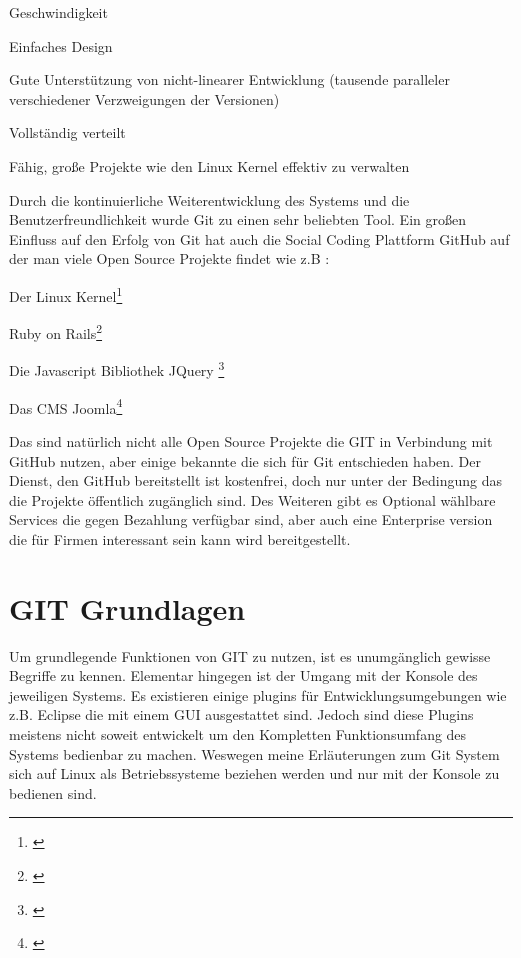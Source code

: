 \documentclass[12pt,a4paper,bibliography=totocnumbered,listof=totocnumbered]{scrartcl}
\begin{document}
\begin{compactitem}
	\item Geschwindigkeit
	\item Einfaches Design
	\item Gute Unterstützung von nicht-linearer Entwicklung (tausende paralleler verschiedener Verzweigungen der Versionen)
	\item Vollständig verteilt
	\item Fähig, große Projekte wie den Linux Kernel effektiv zu verwalten
\end{compactitem}
Durch die kontinuierliche Weiterentwicklung des Systems und die Benutzerfreundlichkeit wurde Git zu einen sehr beliebten Tool.
Ein großen Einfluss auf den Erfolg von Git hat auch die Social Coding Plattform GitHub auf der man viele Open Source Projekte findet wie z.B :

\begin{compactitem}
	\item Der Linux Kernel\footnote{\cite{linux}}
	\item Ruby on Rails\footnote{\cite{ruby}}
	\item Die Javascript Bibliothek JQuery \footnote{\cite{jquery}}
	\item Das CMS Joomla\footnote{\cite{joomla}}
\end{compactitem}

Das sind natürlich nicht alle Open Source Projekte die GIT in Verbindung mit GitHub nutzen, aber einige bekannte die sich für Git entschieden haben. Der Dienst, den GitHub bereitstellt ist kostenfrei, doch nur unter der Bedingung das die Projekte öffentlich zugänglich sind. Des Weiteren gibt es Optional wählbare Services die gegen Bezahlung verfügbar sind, aber auch eine Enterprise version die für Firmen interessant sein kann wird bereitgestellt.    
\pagebreak

\section{GIT Grundlagen}
Um grundlegende Funktionen von GIT zu nutzen, ist es unumgänglich gewisse Begriffe zu kennen. Elementar hingegen ist der Umgang mit der Konsole des jeweiligen Systems. Es existieren einige plugins für Entwicklungsumgebungen wie z.B. Eclipse die mit einem GUI ausgestattet sind. Jedoch sind diese Plugins meistens nicht soweit entwickelt um den Kompletten Funktionsumfang des Systems bedienbar zu machen.
Weswegen meine Erläuterungen zum Git System sich auf Linux als Betriebssysteme beziehen werden und nur mit der Konsole zu bedienen sind.     
\end{document}
